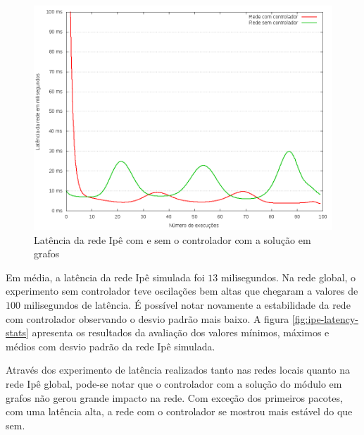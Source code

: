 \begin{figure}[!htb]
    \centering
    \label{fig:ipe-latency}
    \includegraphics[width=\linewidth]{img/ipe-latency}
    \caption{Latência da rede Ipê com e sem o controlador com a solução em 
    grafos}
\end{figure}

Em média, a latência da rede Ipê simulada foi $13$ milisegundos.
Na rede global, o experimento sem controlador teve oscilações bem altas que
chegaram a valores de $100$ milisegundos de latência.
É possível notar novamente a estabilidade da rede com controlador observando
o desvio padrão mais baixo. 
A figura \ref{fig:ipe-latency-stats} apresenta os resultados da avaliação dos
valores mínimos, máximos e médios com desvio padrão da rede Ipê simulada.

Através dos experimento de latência realizados tanto nas redes locais quanto 
na rede Ipê global, pode-se notar que o controlador com a solução do módulo 
em grafos não gerou grande impacto na rede.
Com exceção dos primeiros pacotes, com uma latência alta, a rede com o 
controlador se mostrou mais estável do que sem. 

